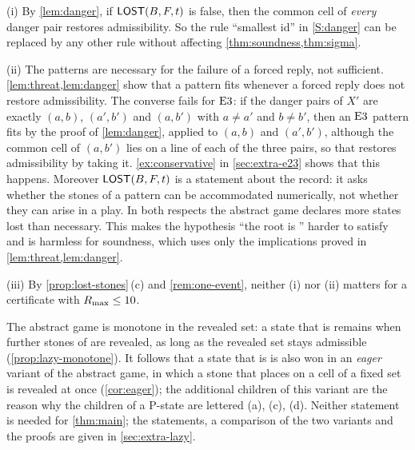 \begin{remark}\label{rem:conservative}
(i) By \cref{lem:danger}, if $\mathsf{LOST}(B,F,t)$ is false, then the common cell of \emph{every} danger pair
restores admissibility. So the rule ``smallest id'' in \ref{S:danger} can be replaced by any other rule
without affecting \cref{thm:soundness,thm:sigma}.

(ii) The patterns are necessary for the failure of a forced reply, not sufficient. \cref{lem:threat,lem:danger} show that a pattern fits whenever a forced reply does not restore admissibility. The
converse fails for $\mathrm{E3}$: if the danger pairs of $X'$ are exactly $(a,b)$, $(a',b')$ and $(a,b')$ with
$a\ne a'$ and $b\ne b'$, then an $\mathrm{E3}$ pattern fits by the proof of \cref{lem:danger}, applied to
$(a,b)$ and $(a',b')$, although the common cell of $(a,b')$ lies on a line of each of the three pairs, so
that \Breaker{} restores admissibility by taking it. \cref{ex:conservative} in \cref{sec:extra-e23} shows that this happens.
Moreover $\mathsf{LOST}(B,F,t)$ is a statement about the record: it asks whether the stones of a pattern can be
accommodated numerically, not whether they can arise in a play. In both respects the abstract game declares
more states lost than necessary. This makes the hypothesis ``the root is \WON'' harder to satisfy and is
harmless for soundness, which uses only the implications proved in \cref{lem:threat,lem:danger}.

(iii) By \cref{prop:lost-stones}\,(c) and \cref{rem:one-event}, neither (i) nor (ii) matters
for a certificate with $R_{\max}\le 10$.
\end{remark}


The abstract game is monotone in the revealed set: a state that is \WON{} remains \WON{} when further
stones of \Maker{} are revealed, as long as the revealed set stays admissible
(\cref{prop:lazy-monotone}). It follows that a state that is \WON{} is also won in an
\emph{eager} variant of the abstract game, in which a stone that \Maker{} places on a cell of a fixed set
is revealed at once (\cref{cor:eager}); the additional children of this variant are the reason why the
children of a P-state are lettered \textup{(a)}, \textup{(c)}, \textup{(d)}. Neither statement is needed
for \cref{thm:main}; the statements, a comparison of the two variants and the proofs are given in
\cref{sec:extra-lazy}.
